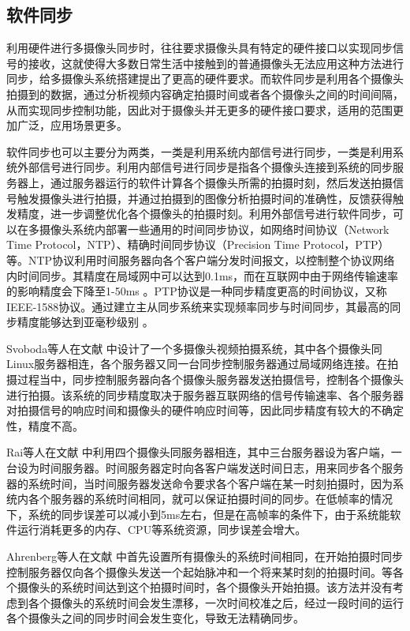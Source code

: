 \subsection{软件同步}

利用硬件进行多摄像头同步时，往往要求摄像头具有特定的硬件接口以实现同步信号的接收，这就使得大多数日常生活中接触到的普通摄像头无法应用这种方法进行同步，给多摄像头系统搭建提出了更高的硬件要求。而软件同步是利用各个摄像头拍摄到的数据，通过分析视频内容确定拍摄时间或者各个摄像头之间的时间间隔，从而实现同步控制功能，因此对于摄像头并无更多的硬件接口要求，适用的范围更加广泛，应用场景更多。

软件同步也可以主要分为两类，一类是利用系统内部信号进行同步，一类是利用系统外部信号进行同步。利用内部信号进行同步是指各个摄像头连接到系统的同步服务器上，通过服务器运行的软件计算各个摄像头所需的拍摄时刻，然后发送拍摄信号触发摄像头进行拍摄，并通过拍摄到的图像分析拍摄时间的准确性，反馈获得触发精度，进一步调整优化各个摄像头的拍摄时刻。利用外部信号进行软件同步，可以在多摄像头系统内部署一些通用的时间同步协议，如网络时间协议（Network Time Protocol，NTP）、精确时间同步协议（Precision Time Protocol，PTP）等。NTP协议利用时间服务器向各个客户端分发时间报文，以控制整个协议网络内时间同步。其精度在局域网中可以达到0.1ms，而在互联网中由于网络传输速率的影响精度会下降至1-50ms \cite{mills2010network} 。PTP协议是一种同步精度更高的时间协议，又称IEEE-1588协议。通过建立主从同步系统来实现频率同步与时间同步，其最高的同步精度能够达到亚毫秒级别 \cite{correll2005design} 。

Svoboda等人在文献 \cite{svoboda2002viroom} 中设计了一个多摄像头视频拍摄系统，其中各个摄像头同Linux服务器相连，各个服务器又同一台同步控制服务器通过局域网络连接。在拍摄过程当中，同步控制服务器向各个摄像头服务器发送拍摄信号，控制各个摄像头进行拍摄。该系统的同步精度取决于服务器互联网络的信号传输速率、各个服务器对拍摄信号的响应时间和摄像头的硬件响应时间等，因此同步精度有较大的不确定性，精度不高。

Rai等人在文献 \cite{rai2003cost} 中利用四个摄像头同服务器相连，其中三台服务器设为客户端，一台设为时间服务器。时间服务器定时向各客户端发送时间日志，用来同步各个服务器的系统时间，当时间服务器发送命令要求各个客户端在某一时刻拍摄时，因为系统内各个服务器的系统时间相同，就可以保证拍摄时间的同步。在低帧率的情况下，系统的同步误差可以减小到5ms左右，但是在高帧率的条件下，由于系统能软件运行消耗更多的内存、CPU等系统资源，同步误差会增大。

Ahrenberg等人在文献 \cite{ahrenberg2004mobile} 中首先设置所有摄像头的系统时间相同，在开始拍摄时同步控制服务器仅向各个摄像头发送一个起始脉冲和一个将来某时刻的拍摄时间。等各个摄像头的系统时间达到这个拍摄时间时，各个摄像头开始拍摄。该方法并没有考虑到各个摄像头的系统时间会发生漂移，一次时间校准之后，经过一段时间的运行各个摄像头之间的同步时间会发生变化，导致无法精确同步。

